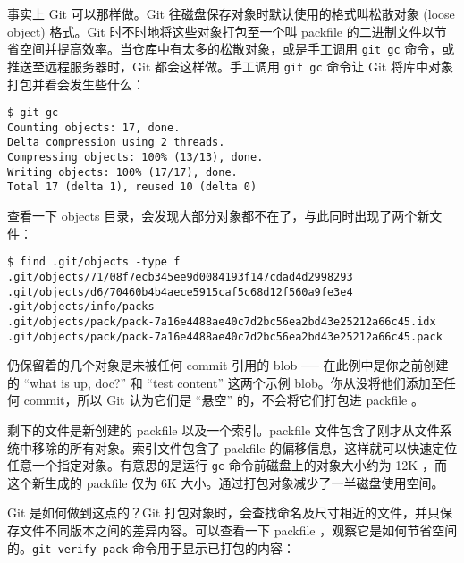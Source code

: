 \documentclass[a4paper]{book}
\begin{document}
事实上 Git 可以那样做。Git 往磁盘保存对象时默认使用的格式叫松散对象 (loose object) 格式。Git 时不时地将这些对象打包至一个叫 packfile 的二进制文件以节省空间并提高效率。当仓库中有太多的松散对象，或是手工调用 \texttt{git gc} 命令，或推送至远程服务器时，Git 都会这样做。手工调用 \texttt{git gc} 命令让 Git 将库中对象打包并看会发生些什么：

\begin{shaded}\begin{verbatim}
$ git gc
Counting objects: 17, done.
Delta compression using 2 threads.
Compressing objects: 100% (13/13), done.
Writing objects: 100% (17/17), done.
Total 17 (delta 1), reused 10 (delta 0)
\end{verbatim}\end{shaded}

查看一下 objects 目录，会发现大部分对象都不在了，与此同时出现了两个新文件：

\begin{shaded}\begin{verbatim}
$ find .git/objects -type f
.git/objects/71/08f7ecb345ee9d0084193f147cdad4d2998293
.git/objects/d6/70460b4b4aece5915caf5c68d12f560a9fe3e4
.git/objects/info/packs
.git/objects/pack/pack-7a16e4488ae40c7d2bc56ea2bd43e25212a66c45.idx
.git/objects/pack/pack-7a16e4488ae40c7d2bc56ea2bd43e25212a66c45.pack
\end{verbatim}\end{shaded}

仍保留着的几个对象是未被任何 commit 引用的 blob ── 在此例中是你之前创建的 “what is up, doc?” 和 “test content” 这两个示例 blob。你从没将他们添加至任何 commit，所以 Git 认为它们是 “悬空” 的，不会将它们打包进 packfile 。

剩下的文件是新创建的 packfile 以及一个索引。packfile 文件包含了刚才从文件系统中移除的所有对象。索引文件包含了 packfile 的偏移信息，这样就可以快速定位任意一个指定对象。有意思的是运行 \texttt{gc} 命令前磁盘上的对象大小约为 12K ，而这个新生成的 packfile 仅为 6K 大小。通过打包对象减少了一半磁盘使用空间。

Git 是如何做到这点的？Git 打包对象时，会查找命名及尺寸相近的文件，并只保存文件不同版本之间的差异内容。可以查看一下 packfile ，观察它是如何节省空间的。\texttt{git verify-pack} 命令用于显示已打包的内容：
\end{document}
